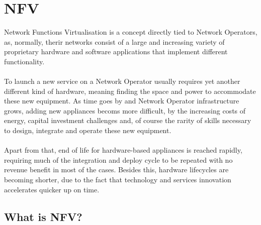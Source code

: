\documentclass[a4paper, 12pt]{book}
\begin{document}
\section{NFV}
\label{sec:nfv}

Network Functions Virtualisation is a concept directly tied to Network Operators, as, normally, therir networks consist of a large and increasing variety of proprietary hardware and software applications that implement different functionality.\\
\\
To launch a new service on a Network Operator usually requires yet another different kind of hardware, meaning finding the space and power to accommodate these new equipment. As time goes by and Network Operator infrastructure grows, adding new appliances becoms more difficult, by the increasing costs of energy, capital investment challenges and, of course the rarity of skills necessary to design, integrate and operate these new equipment.\\
\\
Apart from that, end of life for hardware-based appliances is reached rapidly, requiring much of the integration and deploy cycle to be repeated with no revenue benefit in most of the cases. Besides this, hardware lifecycles are becoming shorter, due to the fact that technology and services innovation accelerates quicker up on time.

\subsection{What is NFV?}
\end{document}
